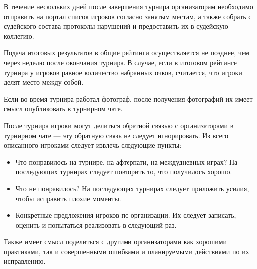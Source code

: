 В течение нескольких дней после завершения турнира организаторам необходимо отправить на портал список игроков согласно занятым местам, а также собрать с судейского состава протоколы нарушений и предоставить их в судейскую коллегию.

Подача итоговых результатов в общие рейтинги осуществляется не позднее, чем через неделю после окончания турнира. В случае, если в итоговом рейтинге турнира у игроков равное количество набранных очков, считается, что игроки делят место между собой.

Если во время турнира работал фотограф, после получения фотографий их имеет смысл опубликовать в турнирном чате.

После турнира игроки могут делиться обратной связью с организаторами в турнирном чате --- эту обратную связь не следует игнорировать. Из всего описанного игроками следует извлечь следующие пункты:
\begin{itemize}
	\item Что понравилось на турнире, на афтерпати, на междудневных играх? На последующих турнирах следует повторить то, что получилось хорошо.
	\item Что не понравилось? На последующих турнирах следует приложить усилия, чтобы исправить плохие моменты.
	\item Конкретные предложения игроков по организации. Их следует записать, оценить и попытаться реализовать в следующий раз.
\end{itemize}

Также имеет смысл поделиться с другими организаторами как хорошими практиками, так и совершенными ошибками и планируемыми действиями по их исправлению. 